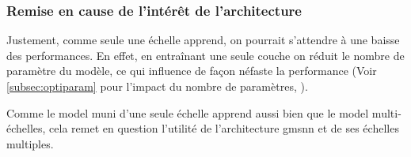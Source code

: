 \subsubsection{Remise en cause de l'intérêt de l'architecture}
Justement, comme seule une échelle apprend, on pourrait s'attendre à une baisse des performances. En effet, en entraînant une seule couche on réduit le nombre de paramètre du modèle, ce qui influence de façon néfaste la performance (Voir \autoref{subsec:optiparam} pour l'impact du nombre de paramètres, ).

Comme le \gls{model} muni d'une seule échelle apprend aussi bien que le \gls{model} multi-échelles, cela remet en question l'utilité de l'architecture \gls{gmsnn} et de ses échelles multiples.
